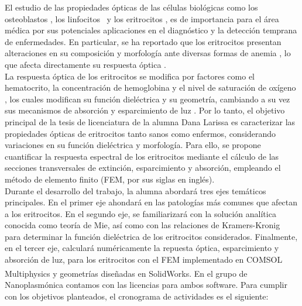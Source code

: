 \documentclass[11pt,letterpaper]{article}
\begin{document}
	El estudio de las propiedades ópticas de las células biológicas como los osteoblastos \cite{antunesOpticalPropertiesBone2019}, los linfocitos~\cite{yoonIdentificationNonactivatedLymphocytes2017} y los eritrocitos \cite{bosschaartLiteratureReviewNovel2014}, es de importancia para el área médica por sus potenciales aplicaciones en el diagnóstico y la detección temprana de enfermedades.  En particular, se ha reportado que los eritrocitos presentan alteraciones en su composición y morfología ante diversas formas de anemia \cite{bosschaartLiteratureReviewNovel2014}, lo que afecta directamente su respuesta óptica \cite{wriedtLightScatteringSingle2006,meinkeOpticalPropertiesPlatelets2007}.\\
	
	La respuesta óptica de los eritrocitos se modifica por factores como el hematocrito, la concentración de hemoglobina y el nivel de saturación de oxígeno \cite{bosschaartLiteratureReviewNovel2014}, los cuales modifican su función dieléctrica y su geometría, cambiando a su vez sus mecanismos de absorción y esparcimiento de luz \cite{bosschaartLiteratureReviewNovel2014}. Por lo tanto, el objetivo principal de la tesis de licenciatura de la alumna Dana Larissa es caracterizar las propiedades ópticas de eritrocitos tanto sanos como enfermos, considerando variaciones en su función dieléctrica y morfología. Para ello, se propone cuantificar la respuesta espectral de los eritrocitos mediante el cálculo de las secciones transversales de extinción, esparcimiento y absorción, empleando el método de elemento finito (FEM, por sus siglas en inglés).\\
	
	Durante el desarrollo del trabajo, la alumna abordará tres ejes temáticos principales. En el primer eje ahondará en las patologías más comunes que afectan a los eritrocitos. En el segundo eje, se familiarizará con la solución analítica conocida como teoría de Mie, así como con las relaciones de Kramers-Kronig~\cite{lucariniKramersKronigRelationsOptical2005} para determinar la función dieléctrica de los eritrocitos considerados. Finalmente, en el tercer eje, calculará numéricamente la repuesta óptica, esparcimiento y absorción de luz, para los eritrocitos con el FEM implementado en COMSOL Multiphysics\textsuperscript{\texttrademark} y geometrías diseñadas en SolidWorks. En el grupo de Nanoplasmónica contamos con las licencias para ambos software. Para cumplir con los objetivos planteados, el cronograma de actividades es el siguiente:
	
\end{document}
